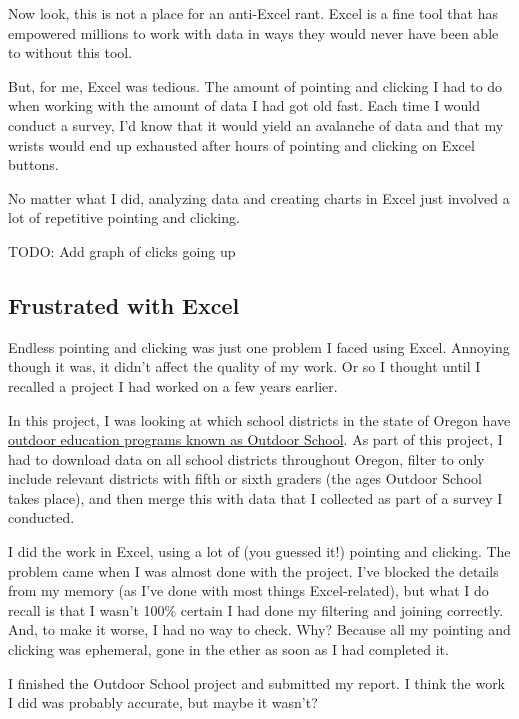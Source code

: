 \documentclass[
]{book}
\begin{document}
Now look, this is not a place for an anti-Excel rant. Excel is a fine tool that has empowered millions to work with data in ways they would never have been able to without this tool.

But, for me, Excel was tedious. The amount of pointing and clicking I had to do when working with the amount of data I had got old fast. Each time I would conduct a survey, I'd know that it would yield an avalanche of data and that my wrists would end up exhausted after hours of pointing and clicking on Excel buttons.

No matter what I did, analyzing data and creating charts in Excel just involved a lot of repetitive pointing and clicking.

TODO: Add graph of clicks going up

\hypertarget{frustrated-with-excel}{%
\subsection{Frustrated with Excel}\label{frustrated-with-excel}}

Endless pointing and clicking was just one problem I faced using Excel. Annoying though it was, it didn't affect the quality of my work. Or so I thought until I recalled a project I had worked on a few years earlier.

In this project, I was looking at which school districts in the state of Oregon have \href{https://oregonstate.app.box.com/s/83g5sjdm88xgqdxfze0ri7qo4uff5sj7}{outdoor education programs known as Outdoor School}. As part of this project, I had to download data on all school districts throughout Oregon, filter to only include relevant districts with fifth or sixth graders (the ages Outdoor School takes place), and then merge this with data that I collected as part of a survey I conducted.

I did the work in Excel, using a lot of (you guessed it!) pointing and clicking. The problem came when I was almost done with the project. I've blocked the details from my memory (as I've done with most things Excel-related), but what I do recall is that I wasn't 100\% certain I had done my filtering and joining correctly. And, to make it worse, I had no way to check. Why? Because all my pointing and clicking was ephemeral, gone in the ether as soon as I had completed it.

I finished the Outdoor School project and submitted my report. I think the work I did was probably accurate, but maybe it wasn't?
\end{document}
